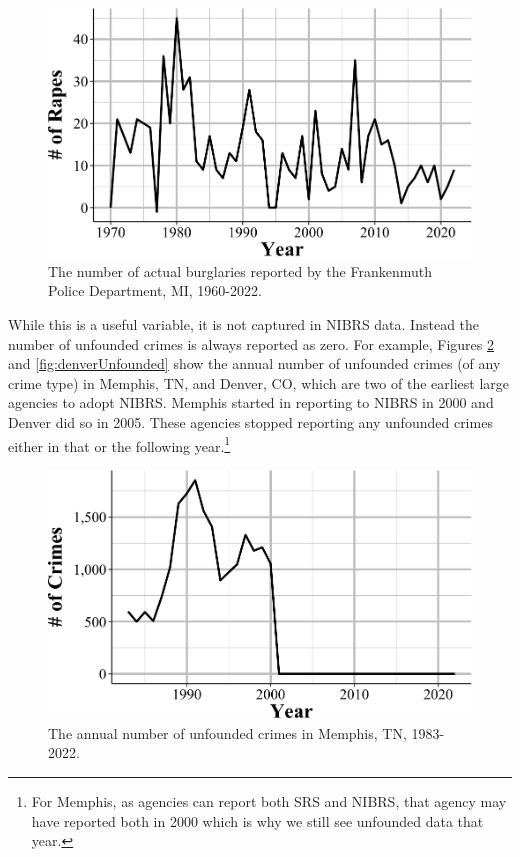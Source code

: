 \documentclass[
  12pt,
  openany]{book}
\begin{document}
\begin{figure}

{\centering \includegraphics[width=0.9\linewidth]{03_offenses_known_files/figure-latex/frankenmuthRape-1} 

}

\caption{The number of actual burglaries reported by the Frankenmuth Police Department, MI, 1960-2022.}\label{fig:frankenmuthRape}
\end{figure}

While this is a useful variable, it is not captured in NIBRS data. Instead the number of unfounded crimes is always reported as zero. For example, Figures \ref{fig:memphisUnfounded} and \ref{fig:denverUnfounded} show the annual number of unfounded crimes (of any crime type) in Memphis, TN, and Denver, CO, which are two of the earliest large agencies to adopt NIBRS. Memphis started in reporting to NIBRS in 2000 and Denver did so in 2005. These agencies stopped reporting any unfounded crimes either in that or the following year.\footnote{For Memphis, as agencies can report both SRS and NIBRS, that agency may have reported both in 2000 which is why we still see unfounded data that year.}

\begin{figure}

{\centering \includegraphics[width=0.9\linewidth]{03_offenses_known_files/figure-latex/memphisUnfounded-1} 

}

\caption{The annual number of unfounded crimes in Memphis, TN, 1983-2022.}\label{fig:memphisUnfounded}
\end{figure}
\end{document}

